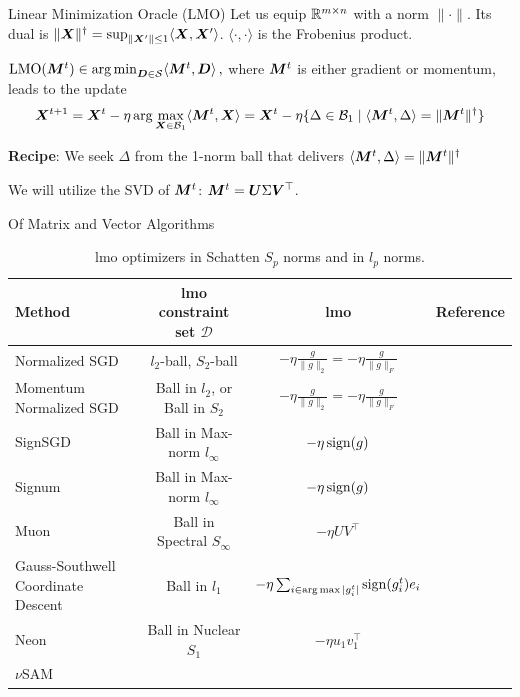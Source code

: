 \documentclass[aspectratio=169]{beamer}
\newcommand{\norm}[1]{\lVert #1\rVert}
\newcommand{\Rmn}{\R^{m\times n}}
\newcommand{\cB}{\mathcal{B}}
\newcommand{\cS}{\mathcal{S}}
\def\<#1,#2>{\langle #1,#2\rangle}
\begin{document}
\begin{frame}{Linear Minimization Oracle (LMO)}
Let us equip $\Rmn$ with a norm $\norm{\cdot}$. Its dual is $\norm{\mX}^\dagger = \sup_{\norm{\mX'}\leq 1} \<\mX,\mX'>$. $\<\cdot, \cdot>$ is the Frobenius product.
\vspace{0.4em}

$\mathrm{LMO}(\mM^t) \in \argmin_{\mD \in \cS} \langle\mM^t, \mD\rangle\,,$ where ${\bm{M}}^t$ is either gradient or momentum, leads to the update
$$\mX^{t+1} = \mX^{t} - \eta \arg\max_{\mX \in \cB_1} \<\mM^t, \mX> = \mX^{t} - \eta \{\Delta \in \cB_1 \mid \<\mM^t, \Delta> = \norm{\mM^t}^\dagger\}$$

\vspace{0.4em}

\textbf{Recipe}: We seek $\Delta$ from the 1-norm ball that delivers $\<\mM^t, \Delta> = \norm{\mM^t}^\dagger$
\vspace{0.4em}

We will utilize the SVD of ${\bm{M}}^t$: ${\bm{M}}^t = {\bm{U}} \Sigma {\bm{V}}^\top$.
\end{frame}
\begin{frame}{Of Matrix and Vector Algorithms}
    \footnotesize
    \begin{table}
    \caption{lmo optimizers in Schatten $S_p$ norms and in $l_p$ norms.}
    \label{tbl:mat_vs_vec_lmo}
    \begin{tabularx}{\linewidth}{|>{\raggedright\arraybackslash}X|c|c|c|}
    \hline
    Method & lmo constraint set $\mathcal D$ & lmo & Reference \\
    \hline\hline
    Normalized SGD & $l_2$-ball, $S_2$-ball & $-\eta \tfrac{g}{\norm{g}_2} = -\eta \tfrac{g}{\norm{g}_F}$ & \citep{hazan2015beyond} \\
    Momentum Normalized SGD & Ball in $l_2$, or Ball in $S_2$ & $-\eta \tfrac{g}{\norm{g}_2} = -\eta\tfrac{g}{\norm{g}_F}$ & \citep{cutkosky2020momentum}\\
    \hline
    SignSGD & Ball in Max-norm $l_\infty$ & $-\eta \operatorname{sign}(g)$ & \citep[Thm. 1]{bernstein2018signsgd} \\
    Signum  & Ball in Max-norm $l_\infty$ & $-\eta \operatorname{sign}(g)$ & \citep[Thm. 3]{bernstein2018signsgd} \\
    \hdashline
    Muon & Ball in Spectral $S_\infty$ & $-\eta UV^\top$ & \citep{jordan2024muon} \\
    \hline
    Gauss-Southwell Coordinate Descent & Ball in $l_1$ & $-\eta \sum_{i \in \operatorname*{arg\,max}|g_i^t|} \operatorname{sign}(g_i^t)e_i$ & \citep[p.19]{shi2016primer}\\
    \hdashline 
    Neon & Ball in Nuclear $S_1$ & $-\eta u_1 v_1^\top$ & \citep{kravatskiy2025fanions} \\
    $\nu$SAM & & & \citep{pethick2025sam} \\
    \hline
    \end{tabularx}
    \end{table}
\end{frame}
\end{document}
